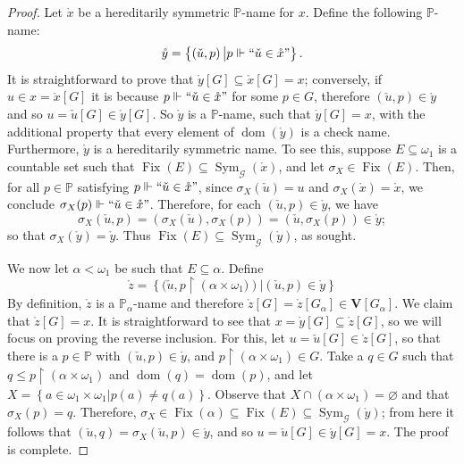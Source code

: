\documentclass[10pt]{amsart}
\DeclareMathOperator{\dom}{dom}
\DeclareMathOperator{\fix}{Fix}
\DeclareMathOperator{\sym}{Sym}
\theoremstyle{definition}
\theoremstyle{remark}
\begin{document}
\begin{proof}
Let $\mathring{x}$ be a hereditarily symmetric $\mathbb P$-name for $x$. Define the following $\mathbb P$-name:
\begin{equation*}
    \mathring{y}=\left\{\left(\check{u},p\right)\big|p\Vdash``\check{u}\in\mathring{x}"\right\}.
\end{equation*}
It is straightforward to prove that $\mathring{y}[G]\subseteq\mathring{x}[G]=x$; conversely, if $u\in x=\mathring{x}[G]$ it is because $p\Vdash``\check{u}\in\mathring{x}"$ for some $p\in G$, therefore $(\check{u},p)\in\mathring{y}$ and so $u=\check{u}[G]\in\mathring{y}[G]$. So $\mathring{y}$ is a $\mathbb P$-name, such that $\mathring{y}[G]=x$, with the additional property that every element of $\dom(\mathring{y})$ is a check name. Furthermore, $\mathring{y}$ is a hereditarily symmetric name. To see this, suppose $E\subseteq\omega_1$ is a countable set such that $\fix(E)\subseteq\sym_{\mathcal G}(\mathring{x})$, and let $\sigma_X\in\fix(E)$. Then, for all $p\in\mathbb P$ satisfying $p\Vdash``\check{u}\in\mathring{x}"$, since $\sigma_X(\check{u})=u$ and $\sigma_X(\mathring{x})=\mathring{x}$, we conclude $\sigma_X(p)\Vdash``\check{u}\in\mathring{x}"$. Therefore, for each $(\check{u},p)\in\mathring{y}$, we have
\begin{equation*}
\sigma_X(\check{u},p)=\left(\sigma_X(\check{u}),\sigma_X(p)\right)=(\check{u},\sigma_X(p))\in\mathring{y};
\end{equation*}
so that $\sigma_X(\mathring{y})=\mathring{y}$. Thus $\fix(E)\subseteq\sym_{\mathcal G}(\mathring{y})$, as sought.

We now let $\alpha <\omega_1$ be such that $E\subseteq\alpha$. Define
\begin{equation*}
    \mathring{z}= \left\{(\check{u},p\upharpoonright\left(\alpha\times\omega_1)\right)\big|(\check{u},p)\in\mathring{y}\right\}
\end{equation*}
By definition, $\mathring{z}$ is a $\mathbb P_\alpha$-name and therefore $\mathring{z}[G]=\mathring{z}[G_\alpha] \in \mathbf{V}[G_\alpha]$. We claim that $\mathring{z}[G]=x$. It is straightforward to see that $x=\mathring{y}[G]\subseteq \mathring{z}[G]$, so we will focus on proving the reverse inclusion. For this, let $u=\check{u}[G]\in\mathring{z}[G]$, so that there is a $p\in\mathbb P$ with $(\check{u},p)\in\mathring{y}$, and $p\upharpoonright(\alpha\times\omega_1)\in G$. Take a $q\in G$ such that $q\leq p\upharpoonright(\alpha\times\omega_1)$ and $\dom(q)=\dom(p)$, and let $X=\left\{a\in \omega_1 \times \omega_1\big|p(a)\neq q(a)\right\}$. Observe that $X\cap(\alpha\times\omega_1)=\varnothing$ and that $\sigma_X (p)=q$. Therefore, $\sigma_X\in\fix(\alpha)\subseteq\fix(E)\subseteq\sym_{\mathcal G}(\mathring{y})$; from here it follows that  $(\check{u},q)=\sigma_X (\check{u},p)\in\mathring{y}$, and so $u=\check{u}[G]\in\mathring{y}[G]=x$. The proof is complete.
\end{proof}
\end{document}
